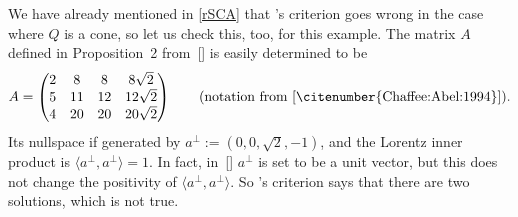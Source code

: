 \documentclass[reqno]{amsart}
\begin{document}
\begin{ex}
  We have already mentioned in \cref{rSCA} that
  's criterion goes wrong in the case
  where $Q$ is a cone, so let us check this, too, for this
  example. The matrix $A$ defined in Proposition~2
  from~[] is easily determined to be
  \[
    A =
    \begin{pmatrix}
      2 & 8 & 8 & 8 \sqrt 2 \\
      5 & 11 & 12 & 12 \sqrt 2 \\
      4 & 20 & 20 & 20 \sqrt 2
    \end{pmatrix} \qquad \text{(notation
      from~[\citenumber{Chaffee:Abel:1994}])}.
  \]
  Its nullspace if generated by $a^\perp := (0,0,\sqrt 2,-1)$, and the
  Lorentz inner product is $\langle a^\perp,a^\perp\rangle = 1$. In
  fact, in~[] $a^\perp$ is set to
  be a unit vector, but this does not change the positivity of
  $\langle a^\perp,a^\perp\rangle$. So 's
  criterion says that there are two solutions, which is not true.
\end{ex}
\end{document}
